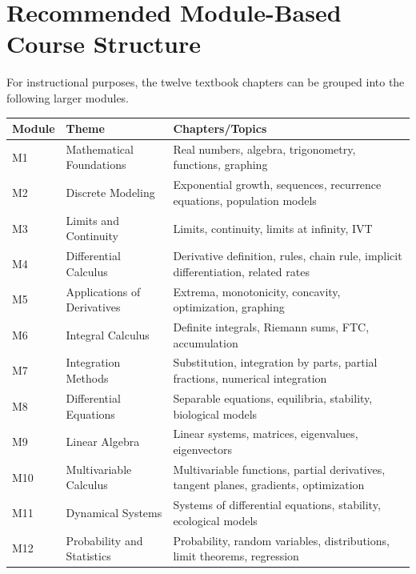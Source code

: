 \documentclass[11pt]{article}
\begin{document}

\section{Recommended Module-Based Course Structure}

For instructional purposes, the twelve textbook chapters can be
grouped into the following larger modules.

\begin{longtable}{p{} p{} p{}}
\toprule
\textbf{Module} & \textbf{Theme} & \textbf{Chapters/Topics}\\
\midrule
M1 &
Mathematical Foundations &
Real numbers, algebra, trigonometry, functions, graphing\\
\addlinespace
M2 &
Discrete Modeling &
Exponential growth, sequences, recurrence equations, population models\\
\addlinespace
M3 &
Limits and Continuity &
Limits, continuity, limits at infinity, IVT\\
\addlinespace
M4 &
Differential Calculus &
Derivative definition, rules, chain rule, implicit differentiation,
related rates\\
\addlinespace
M5 &
Applications of Derivatives &
Extrema, monotonicity, concavity, optimization, graphing\\
\addlinespace
M6 &
Integral Calculus &
Definite integrals, Riemann sums, FTC, accumulation\\
\addlinespace
M7 &
Integration Methods &
Substitution, integration by parts, partial fractions,
numerical integration\\
\addlinespace
M8 &
Differential Equations &
Separable equations, equilibria, stability, biological models\\
\addlinespace
M9 &
Linear Algebra &
Linear systems, matrices, eigenvalues, eigenvectors\\
\addlinespace
M10 &
Multivariable Calculus &
Multivariable functions, partial derivatives, tangent planes,
gradients, optimization\\
\addlinespace
M11 &
Dynamical Systems &
Systems of differential equations, stability, ecological models\\
\addlinespace
M12 &
Probability and Statistics &
Probability, random variables, distributions, limit theorems,
regression\\
\bottomrule
\end{longtable}
\end{document}
